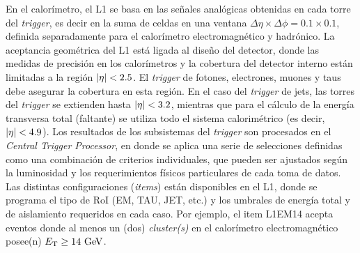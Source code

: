 En el calorímetro, el L1 se basa en las señales analógicas obtenidas en cada
torre del \emph{trigger}, es decir en la suma de celdas en una ventana $\Delta \eta
\times \Delta \phi = 0.1 \times 0.1$, definida separadamente para el calorímetro
electromagnético y hadrónico. La aceptancia geométrica del L1 está ligada al
diseño del detector, donde las medidas de precisión en los calorímetros y la
cobertura del detector interno están limitadas a la región $\abseta < 2.5$. El
\emph{trigger} de fotones, electrones, muones y taus debe asegurar la cobertura en esta
región. En el caso del \emph{trigger} de jets, las torres del \emph{trigger} se
extienden hasta $\abseta < 3.2$, mientras que para el cálculo de la energía
transversa total (faltante) se utiliza todo el sistema calorimétrico (es decir,
$\abseta < 4.9$). Los resultados de los subsistemas del \emph{trigger} son procesados
en el \emph{Central Trigger Processor}, en donde se aplica una serie de
selecciones definidas como una combinación de criterios individuales, que pueden
ser ajustados según la luminosidad y los requerimientos físicos particulares de
cada toma de datos. Las distintas configuraciones (\emph{items}) están
disponibles en el L1, donde se programa el tipo de RoI (EM, TAU, JET, etc.) y
los umbrales de energía total y de aislamiento requeridos en cada caso. Por
ejemplo, el item L1EM14 acepta eventos donde al menos un (dos) \emph{cluster(s)} en el
calorímetro electromagnético posee(n) $\et \geq 14 \GeV$.

